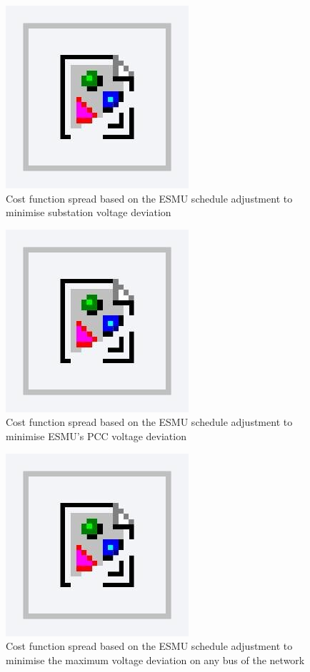 \begin{figure}\centering
	\includegraphics{foo} %
	\caption{Cost function spread based on the ESMU schedule adjustment to minimise substation voltage deviation}
\end{figure}

\begin{figure}\centering
	\includegraphics{foo} %
	\caption{Cost function spread based on the ESMU schedule adjustment to minimise ESMU's PCC voltage deviation}
\end{figure}

\begin{figure}\centering
	\includegraphics{foo} %
	\caption{Cost function spread based on the ESMU schedule adjustment to minimise the maximum voltage deviation on any bus of the network}
\end{figure}

